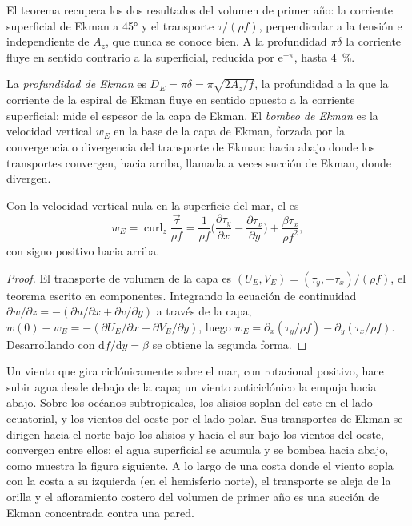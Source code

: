El teorema recupera los dos resultados del volumen de primer año: la corriente superficial de Ekman
a \ang{45} y el transporte $\tau/(\rho f)$, perpendicular a
la tensión e independiente de $A_z$, que nunca se conoce bien. A la
profundidad $\pi\delta$ la corriente fluye en sentido contrario a la superficial, reducida
por $\mathrm e^{-\pi}$, hasta \qty{4}{\percent}.

\begin{definition}\label{def:b3:ocean-dynamics:ekman-pumping}
La \emph{profundidad de Ekman} es $D_E = \pi\delta =
\pi\sqrt{2A_z/f}$, la profundidad a la que la corriente de la espiral de Ekman
fluye en sentido opuesto a la corriente superficial; mide el espesor de la
capa de Ekman. El \emph{bombeo de Ekman} es la
velocidad vertical $w_E$ en la base de la capa de Ekman, forzada por la convergencia o
divergencia del transporte de Ekman: hacia abajo donde los transportes
convergen, hacia arriba, llamada a veces succión de Ekman, donde divergen.
\end{definition}

\begin{proposition}\label{prop:b3:ocean-dynamics:pumping}
Con la velocidad vertical nula en la superficie del mar, el  es
\[
w_E = \operatorname{curl}_z\frac{\vec\tau}{\rho f}
= \frac{1}{\rho f}\Big(\frac{\partial\tau_y}{\partial x} -
\frac{\partial\tau_x}{\partial y}\Big) + \frac{\beta\tau_x}{\rho f^2} ,
\]
con signo positivo hacia arriba.
\end{proposition}

\begin{proof}
El transporte de volumen de la capa es $(U_E, V_E) = (\tau_y,
-\tau_x)/(\rho f)$, el teorema escrito en componentes. Integrando la
ecuación de continuidad $\partial w/\partial z = -(\partial u/\partial x +
\partial v/\partial y)$ a través de la capa, $w(0) - w_E = -(\partial
U_E/\partial x + \partial V_E/\partial y)$, luego $w_E = \partial_x(\tau_y/\rho
f) - \partial_y(\tau_x/\rho f)$. Desarrollando con $\mathrm df/\mathrm dy =
\beta$ se obtiene la segunda forma.
\end{proof}

Un viento que gira ciclónicamente sobre el mar, con rotacional positivo, hace subir
agua desde debajo de la capa; un viento anticiclónico la empuja hacia abajo. Sobre
los océanos subtropicales, los alisios soplan del este en el
lado ecuatorial, y los vientos del oeste por el lado polar. Sus transportes de Ekman
se dirigen hacia el norte bajo los alisios y hacia el sur bajo los vientos del oeste,
convergen entre ellos: el agua superficial se acumula y se bombea hacia abajo, como
muestra la figura siguiente. A lo largo de una costa donde el
viento sopla con la costa a su izquierda (en el hemisferio norte), el
transporte se aleja de la orilla y el afloramiento costero del volumen de primer año
es una succión de Ekman concentrada contra una pared.

